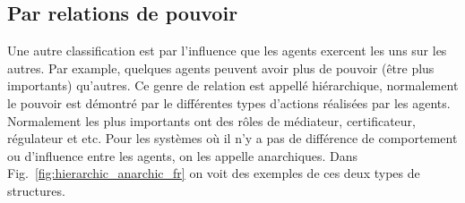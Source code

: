 \documentclass[../main.tex]{subfiles}
\begin{document}
\subsection{Par relations de pouvoir}\label{sec:par-relations-de}
Une autre classification est par l'influence que les agents exercent les uns sur les autres.
Par example, quelques agents peuvent avoir plus de pouvoir (être plus importants) qu'autres.
Ce genre de relation est appellé hiérarchique, normalement le pouvoir est démontré par le différentes types d'actions réalisées par les agents.
Normalement les plus importants ont des rôles de médiateur, certificateur, régulateur et etc.
Pour les systèmes où il n'y a pas de différence de comportement ou d'influence entre les agents, on les appelle anarchiques.
Dans Fig.~\ref{fig:hierarchic_anarchic_fr} on voit des exemples de ces deux types de structures.
\end{document}
